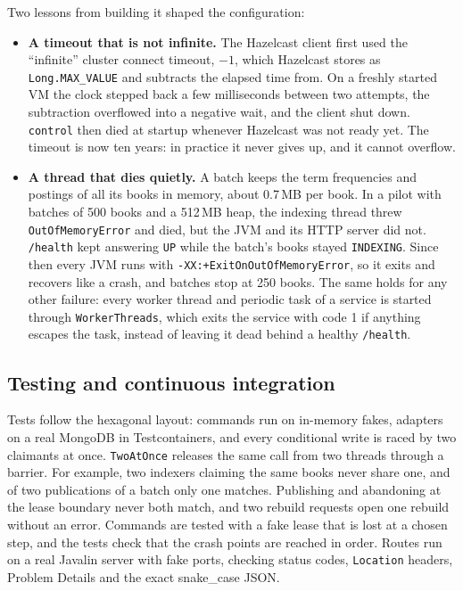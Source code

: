 \documentclass[11pt,a4paper]{article}
\newcommand{\code}[1]{\nolinkurl{#1}}
\begin{document}
Two lessons from building it shaped the configuration:
\begin{itemize}
\item \textbf{A timeout that is not infinite.} The Hazelcast client first used the ``infinite'' cluster connect
  timeout, $-1$, which Hazelcast stores as \code{Long.MAX_VALUE} and subtracts the elapsed time from. On a freshly
  started VM the clock stepped back a few milliseconds between two attempts, the subtraction overflowed into a negative
  wait, and the client shut down. \code{control} then died at startup whenever Hazelcast was not ready yet. The timeout
  is now ten years: in practice it never gives up, and it cannot overflow.
\item \textbf{A thread that dies quietly.} A batch keeps the term frequencies and postings of all its books in memory,
  about 0.7\,MB per book. In a pilot with batches of 500 books and a 512\,MB heap, the indexing thread threw
  \code{OutOfMemoryError} and died, but the JVM and its HTTP server did not. \code{/health} kept answering \code{UP}
  while the batch's books stayed \code{INDEXING}. Since then every JVM runs with \code{-XX:+ExitOnOutOfMemoryError}, so
  it exits and recovers like a crash, and batches stop at 250 books. The same holds for any other failure: every worker
  thread and periodic task of a service is started through \code{WorkerThreads}, which exits the service with code 1
  if anything escapes the task, instead of leaving it dead behind a healthy \code{/health}.
\end{itemize}

\subsection{Testing and continuous integration}
\label{sec:testing}

Tests follow the hexagonal layout: commands run on in-memory fakes, adapters on a real MongoDB in Testcontainers, and
every conditional write is raced by two claimants at once. \code{TwoAtOnce} releases the same call from two threads
through a barrier. For example, two indexers claiming the same books never share one, and of two publications of a
batch only one matches. Publishing and abandoning at the lease boundary never both match, and two rebuild requests open
one rebuild without an error. Commands are tested with a fake lease that is lost at a chosen step, and the tests check
that the crash points are reached in order. Routes run on a real Javalin server with fake ports, checking status
codes, \code{Location} headers, Problem Details and the exact snake\_case JSON.
\end{document}
